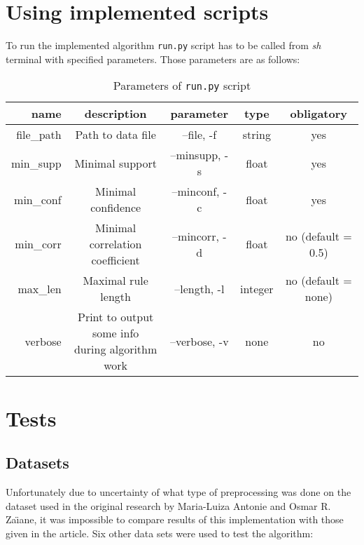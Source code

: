 \documentclass{article}
\begin{document}
	\section{Using implemented scripts}
	To run the implemented algorithm \texttt{run.py} script has to be called from \textit{sh} terminal with specified parameters. Those parameters are as follows:
	\begin{table}[H]
		\centering
		\begin{tabular}{r|c c c c}
		name&description&parameter&type&obligatory\\
		\hline
		file\_path&Path to data file&--file, -f&string&yes\\
		\hline
		min\_supp&Minimal support&--minsupp, -s&float&yes\\
		\hline
		min\_conf&Minimal confidence&--minconf, -c&float&yes\\
		\hline
		min\_corr&Minimal correlation coefficient&--mincorr, -d&float&no (default = 0.5)\\
		\hline
		max\_len&Maximal rule length&--length, -l&integer&no (default = none)\\
		\hline
		verbose&\makecell{Print to output some info\\ during algorithm work}&--verbose, -v& none &no\\
		\end{tabular}
	\caption{Parameters of \texttt{run.py} script}
	\end{table}
	
	
	\section{Tests}
	\subsection{Datasets}
	Unfortunately due to uncertainty of what type of preprocessing was done on the dataset used in the original research by Maria-Luiza Antonie and Osmar R. Za\"{\i}ane, it was impossible to compare results of this implementation with those given in the article. Six other data sets were used to test the algorithm: 
	\newpage
		
\end{document}
